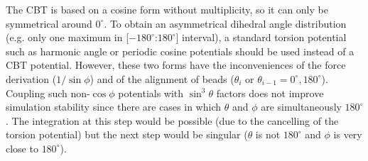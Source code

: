 %
The CBT is based on a cosine form without multiplicity, so it can only be symmetrical around $0^{\circ}$.
To obtain an asymmetrical dihedral angle distribution (e.g. only one maximum in [$-180^{\circ}$:$180^{\circ}$] interval),
a standard torsion potential such as harmonic angle  or  periodic cosine potentials should be used instead of a CBT potential.
However, these two forms have the inconveniences of the force derivation ($1/\sin\phi$) and of the alignment of beads
($\theta_i$ or $\theta_{i-1} = 0^{\circ}, 180^{\circ}$).
Coupling such non-$\cos\phi$ potentials with $\sin^3\theta$ factors does not improve simulation stability since there are
cases in which $\theta$ and $\phi$ are simultaneously $180^{\circ}$. The integration at this step would be possible
(due to the cancelling of the torsion potential) but the next step would be singular
($\theta$ is not $180^{\circ}$ and $\phi$ is very close to $180^{\circ}$).

